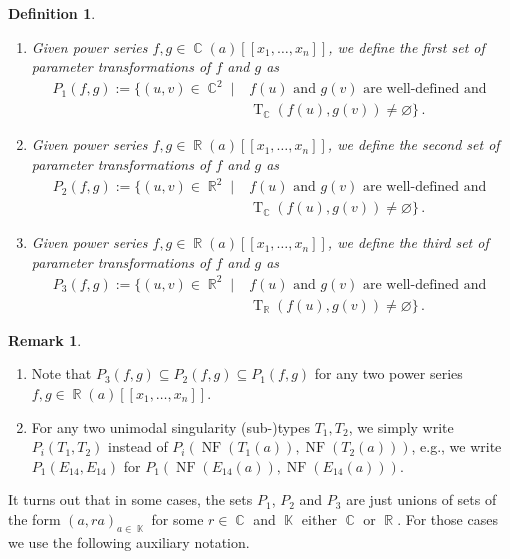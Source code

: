 \documentclass[noend]{amsproc}
\newtheorem{defn}[theorem]{Definition}
\theoremstyle{definition}
\newtheorem{remark}[theorem]{Remark}
\newcommand{\NF}[1]{\operatorname{NF}(#1)}
\DeclareMathOperator{\R}{\mathbb{R}}
\DeclareMathOperator{\C}{\mathbb{C}}
\DeclareMathOperator{\K}{\mathbb{K}}
\DeclareMathOperator{\T}{T}
\begin{document}
\begin{defn}
\phantom{X}\hfill
\begin{enumerate}
\item
Given power series $f,g \in \C(a)[[x_1,\ldots,x_n]]$, we define the
first set of parameter transformations of $f$ and $g$ as
\begin{align*}
P_1(f, g)
:= \{ (u, v) \in \C^2 \mid
&f(u) \text{ and } g(v) \text{ are well-defined and } \\
&\T_{\C}(f(u), g(v)) \neq \varnothing \} \,.
\end{align*}

\item
Given power series $f,g \in \R(a)[[x_1,\ldots,x_n]]$, we define the
second set of parameter transformations of $f$ and $g$ as
\begin{align*}
P_2(f, g)
:= \{ (u, v) \in \R^2 \mid
&f(u) \text{ and } g(v) \text{ are well-defined and } \\
&\T_{\C}(f(u), g(v)) \neq \varnothing \} \,.
\end{align*}

\item
Given power series $f,g \in \R(a)[[x_1,\ldots,x_n]]$, we define the
third set of parameter transformations of $f$ and $g$ as
\begin{align*}
P_3(f, g)
:= \{ (u, v) \in \R^2 \mid
&f(u) \text{ and } g(v) \text{ are well-defined and } \\
&\T_{\R}(f(u), g(v)) \neq \varnothing \} \,.
\end{align*}
\end{enumerate}
\end{defn}

\begin{remark}
\phantom{X}\hfill
\begin{enumerate}
\item
Note that $P_3(f, g) \subseteq P_2(f, g) \subseteq P_1(f, g)$ for any two power
series $f,g \in \R(a)[[x_1,\ldots,x_n]]$.

\item
For any two unimodal singularity (sub-)types $T_1, T_2$, we simply write
$P_i(T_1,T_2)$ instead of $P_i(\NF{T_1(a)}, \NF{T_2(a)})$, e.g., we write
$P_1(E_{14}, E_{14})$ for $P_1(\NF{E_{14}(a)}, \NF{E_{14}(a)})$.
\end{enumerate}
\end{remark}

It turns out that in some cases, the sets $P_1$, $P_2$ and $P_3$ are just
unions of sets of the form $(a, ra)_{a \in \K}$ for some $r \in \C$ and $\K$
either $\C$ or $\R$. For those cases we use the following auxiliary notation.
\end{document}
